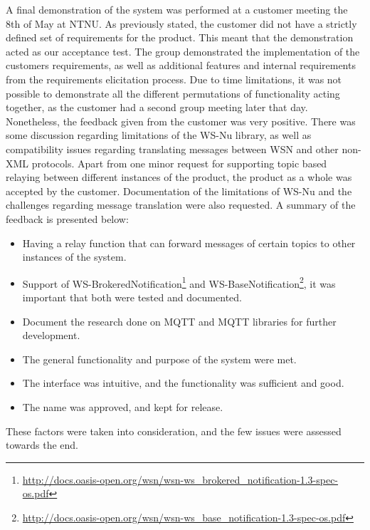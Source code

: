 A final demonstration of the system was performed at a customer meeting the 8th of May at NTNU. As previously stated, the customer did not have a strictly defined set of requirements for the product. This meant that the demonstration acted as our acceptance test. The group demonstrated the implementation of the customers requirements, as well as additional features and internal requirements from the requirements elicitation process. Due to time limitations, it was not possible to demonstrate all the different permutations of functionality acting together, as the customer had a second group meeting later that day. Nonetheless, the feedback given from the customer was very positive. There was some discussion regarding limitations of the WS-Nu library, as well as compatibility issues regarding translating messages between WSN and other non-XML protocols. Apart from one minor request for supporting topic based relaying between different instances of the product, the product as a whole was accepted by the customer. Documentation of the limitations of WS-Nu and the challenges regarding message translation were also requested. A summary of the feedback is presented below:

\begin{itemize}
\item Having a relay function that can forward messages of certain topics to other instances of the system.
\item Support of WS-BrokeredNotification\footnote{\url{http://docs.oasis-open.org/wsn/wsn-ws_brokered_notification-1.3-spec-os.pdf}} and WS-BaseNotification\footnote{\url{http://docs.oasis-open.org/wsn/wsn-ws_base_notification-1.3-spec-os.pdf}}, it was important that both were tested and documented.
\item Document the research done on MQTT and MQTT libraries for further development.
\item The general functionality and purpose of the system were met.
\item The interface was intuitive, and the functionality was sufficient and good.
\item The name was approved, and kept for release.
\end{itemize}

These factors were taken into consideration, and the few issues were assessed towards the end.

\clearpage